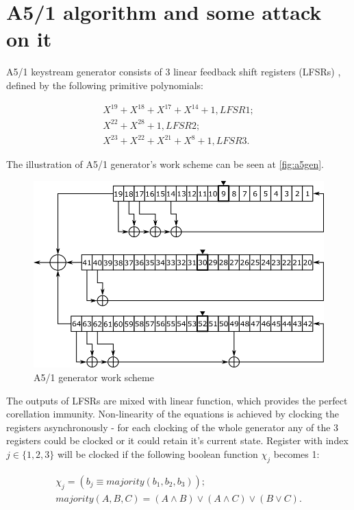 \documentclass[runningheads,a4paper]{llncs}[2015/06/24]
\begin{document}
\section{A5/1 algorithm and some attack on it}\label{sec:alg}

A5/1 keystream generator consists of 3 linear feedback shift registers (LFSRs)
\cite{MENEZES}, defined by the following primitive polynomials:

\begin{gather*} X^{19}+X^{18}+X^{17}+X^{14}+1, LFSR1;\\X^{22}+X^{28}+1,
	LFSR2;\\ X^{23}+X^{22}+X^{21}+X^{8}+1, LFSR3.\end{gather*}

The illustration of A5/1 generator's work scheme can be seen at
\cref{fig:a5gen}.

\begin{figure}
	\includegraphics[width=\linewidth]{./a51.png} \caption{A5/1 generator work
scheme} \label{fig:a51gen} \end{figure}

The outputs of LFSRs are mixed with linear function, which provides the perfect
corellation immunity. Non-linearity of the equations is achieved by clocking
the registers asynchronously - for each clocking of the whole generator any of
the 3 registers could be clocked or it could retain it's current state.
Register with index $j \in \{1,2,3\}$ will be clocked if the following boolean
function $\chi_j$ becomes 1:

\begin {gather*} \chi_j = (b_j \equiv majority(b_1,b_2,b_3));
\\majority(A,B,C)=(A \wedge B) \vee (A \wedge C) \vee (B \vee C).
\end{gather*}
\end{document}
